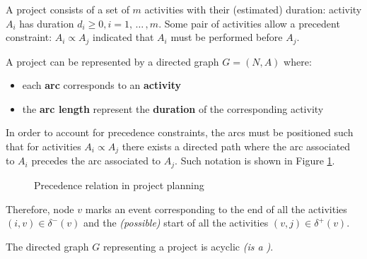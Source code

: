 \documentclass[english]{article}
\begin{document}
\begin{problem}
A project consists of a set of \(m\) activities with their (estimated) duration: activity \(A_i\) has duration \(d_i \geq 0, i = 1, \, \ldots \,, m\).
Some pair of activities allow a precedent constraint: \(A_i \propto A_j\) indicated that \(A_i\) must be performed before \(A_j\).

A project can be represented by a directed graph \(G = (N, A)\) where:
\begin{itemize}
  \item each \textbf{arc} corresponds to an \textbf{activity}
  \item the \textbf{arc length} represent the \textbf{duration} of the corresponding activity
\end{itemize}
\end{problem}

\bigskip
In order to account for precedence constraints, the arcs must be positioned such that for activities \(A_i \propto A_j\) there exists a directed path where the arc associated to \(A_i\) precedes the arc associated to \(A_j\).
Such notation is shown in Figure \ref{fig:precedence-relation-in-project-planning}.

\begin{figure}[htbp]
  \centering
  \bigskip
  \bigskip
  \caption{Precedence relation in project planning}
  \label{fig:precedence-relation-in-project-planning}
\end{figure}

Therefore, node \(v\) marks an event corresponding to the end of all the activities \(\left( i, v \right) \in \delta^-(v)\) and the \textit{(possible)} start of all the activities \(\left( v, j \right) \in \delta^+(v)\).

\bigskip
\begin{property}
  The directed graph \(G\) representing a project is acyclic \textit{(is a \DAG)}.
\end{property}
\end{document}

